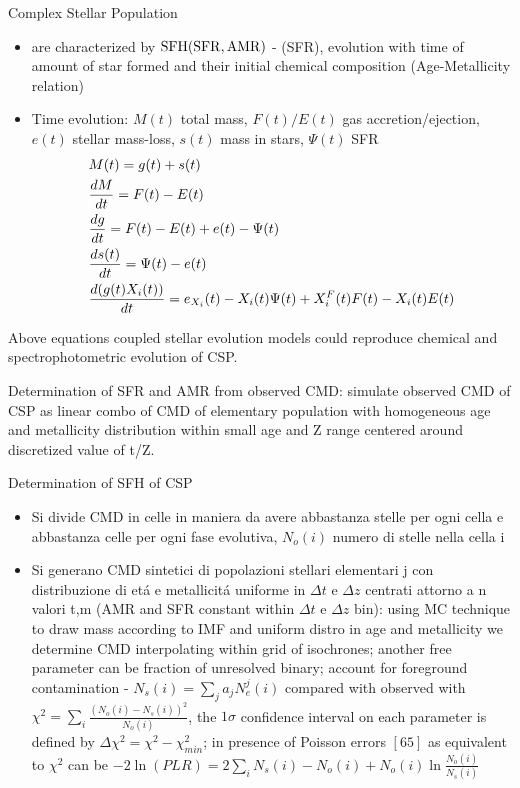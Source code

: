 \begin{frame}{Complex Stellar Population}
\begin{itemize}
\item {} are characterized by  $\SFH(\SFR,\AMR)$ -   (SFR), evolution with time of amount of star formed and their initial chemical composition (Age-Metallicity relation) 
\item Time evolution: $M(t)$ total mass, $F(t)/E(t)$ gas accretion/ejection, $e(t)$ stellar mass-loss, $s(t)$ mass in stars, $\Psi(t)$ SFR
\begin{align*}
&M(t)=g(t)+s(t)\\
&\TDy{t}{M}=F(t)-E(t)\\
&\TDy{t}{g}=F(t)-E(t)+e(t)-\Psi(t)\\
&\TDy{t}{s(t)}=\Psi(t)-e(t)\\
&\TDy{t}{(g(t)X_i(t))}=e_{X_i}(t)-X_i(t)\Psi(t)+X_i^F(t)F(t)-X_i(t)E(t)
\end{align*}
\end{itemize}
Above equations coupled stellar evolution models could reproduce chemical and spectrophotometric evolution of CSP.

Determination of SFR and AMR from observed CMD: simulate observed CMD of CSP as linear combo of CMD of elementary population with homogeneous age and metallicity distribution within small age and Z range centered around discretized value of t/Z.
\end{frame}

\begin{frame}{Determination of SFH of CSP}
\begin{itemize}
\item Si divide CMD in celle in maniera da avere abbastanza stelle per ogni cella e abbastanza celle per ogni fase evolutiva, $N_o(i)$ numero di stelle nella cella i
\item Si generano CMD sintetici di popolazioni stellari elementari j con distribuzione di et\'a e metallicit\'a uniforme in $\Delta t$ e $\Delta z$ centrati attorno a n valori t,m (AMR and SFR constant within $\Delta t$ e $\Delta z$ bin): using MC technique to draw mass according to IMF and uniform distro in age and metallicity we determine CMD interpolating within grid of isochrones; another free parameter can be fraction of unresolved binary; account for foreground contamination - $N_s(i)=\sum_ja_jN_e^j(i)$ compared with observed with $\chi^2=\sum_i\frac{(N_o(i)-N_s(i))^2}{N_o(i)}$, the $1\sigma$ confidence interval on each parameter is defined by $\Delta\chi^2=\chi^2-\chi^2_{min}$; in presence of Poisson errors $[65]$ as equivalent to $\chi^2$ can be $-2\ln{(PLR)}=2\sum_iN_s(i)-N_o(i)+N_o(i)\ln{\frac{N_o(i)}{N_s(i)}}$
\end{itemize}
\end{frame}

